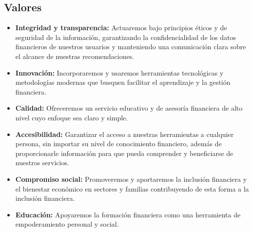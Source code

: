 {}
\subsection*{Valores}


\begin{itemize}
	\item \textbf{Integridad y transparencia:} Actuaremos bajo principios éticos y de seguridad de la información, garantizando la confidencialidad de los datos financieros de nuestros usuarios y manteniendo una comunicación clara sobre el alcance de nuestras recomendaciones.
	
	\item \textbf{Innovación:} Incorporaremos y usaremos herramientas tecnológicas y metodologías modernas que busquen facilitar el aprendizaje y la gestión financiera. 
	
	\item \textbf{Calidad:} Ofreceremos un servicio educativo y de asesoría financiera de alto nivel cuyo enfoque sea claro y simple.
	
	\item \textbf{Accesibilidad:} Garantizar el acceso a nuestras herramientas a cualquier persona, sin importar su nivel de conocimiento financiero, además de proporcionarle información para que pueda comprender y beneficiarse de nuestros servicios.
	
	\item \textbf{Compromiso social:} Promoveremos y aportaremos la inclusión financiera y el bienestar económico en sectores y familias contribuyendo de esta forma a la inclusión financiera.
	
	\item \textbf{Educación:} Apoyaremos la formación financiera como una herramienta de empoderamiento personal y social.
\end{itemize}